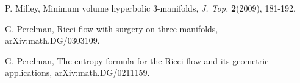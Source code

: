 \begin{thebibliography}{GHMTY}
 P. Milley, Minimum volume hyperbolic 3-manifolds, \textit {J. Top.} \textbf {2}(2009), 181-192.

{} G. Perelman, Ricci flow with surgery on three-manifolds, arXiv:math.DG/0303109.

 G. Perelman, The entropy formula for the Ricci flow and its geometric applications, arXiv:math.DG/0211159.

% 


\end{thebibliography}

 
